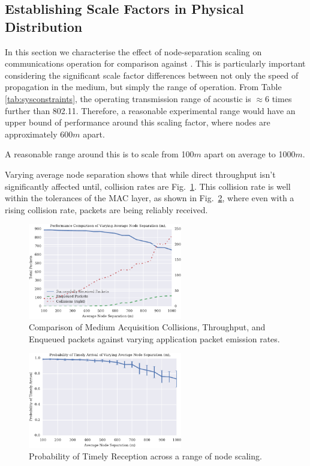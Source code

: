 \documentclass[runningheads,a4paper]{llncs}
\begin{document}
\subsection{Establishing Scale Factors in Physical Distribution}

In this section we characterise the effect of node-separation scaling on communications operation for comparison against \cite{Guo11}. This is particularly important considering the significant scale factor differences between not only the speed of propagation in the medium, but simply the range of operation. 
From Table \ref{tab:sysconstraints}, the operating transmission range of acoustic is $\approx 6$ times further than 802.11. Therefore, a reasonable experimental range would have an upper bound of performance around this scaling factor, where nodes are approximately 600$m$ apart. 

A reasonable range around this is to scale from 100$m$ apart on average to 1000$m$.

Varying average node separation shows that while direct throughput isn't significantly affected until, collision rates are Fig.~\ref{fig:throughput_performance_range}.
This collision rate is well within the tolerances of the MAC layer, as shown in Fig.~\ref{fig:prod_breakdown_range}, where even with a rising collision rate, packets are being reliably received.

\begin{figure}[H]
  \centering
  \includegraphics[width=0.6\textwidth]{img/throughput_performance_range.pdf}
  \caption{Comparison of Medium Acquisition Collisions, Throughput, and Enqueued packets against varying application packet emission rates.}
  \label{fig:throughput_performance_range}
\end{figure}

\begin{figure}[H]
  \centering
  \includegraphics[width=0.6\textwidth]{img/prod_breakdown_range.pdf}
  \caption{Probability of Timely Reception across a range of node scaling.}
  \label{fig:prod_breakdown_range}
\end{figure}
\end{document}
